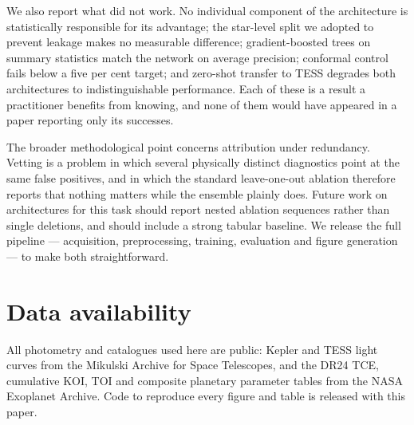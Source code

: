 \documentclass[preprint,12pt,authoryear]{elsarticle}
\begin{document}
We also report what did not work. No individual component of the architecture is
statistically responsible for its advantage; the star-level split we adopted to
prevent leakage makes no measurable difference; gradient-boosted trees on
summary statistics match the network on average precision; conformal control
fails below a five per cent target; and zero-shot transfer to TESS degrades both
architectures to indistinguishable performance. Each of these is a result a
practitioner benefits from knowing, and none of them would have appeared in a
paper reporting only its successes.

The broader methodological point concerns attribution under redundancy. Vetting
is a problem in which several physically distinct diagnostics point at the same
false positives, and in which the standard leave-one-out ablation therefore
reports that nothing matters while the ensemble plainly does. Future work on
architectures for this task should report nested ablation sequences rather than
single deletions, and should include a strong tabular baseline. We release the
full pipeline --- acquisition, preprocessing, training, evaluation and figure
generation --- to make both straightforward.

\section*{Data availability}

All photometry and catalogues used here are public: Kepler and TESS light curves
from the Mikulski Archive for Space Telescopes, and the DR24 TCE, cumulative KOI,
TOI and composite planetary parameter tables from the NASA Exoplanet Archive.
Code to reproduce every figure and table is released with this paper.



\end{document}
